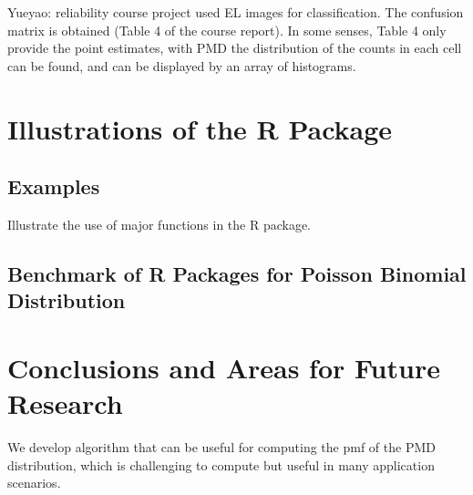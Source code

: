 \documentclass[12pt]{article}
\begin{document}
Yueyao: reliability course project used EL images for classification. The confusion matrix is obtained (Table 4 of the course report). In some senses, Table 4 only provide the point estimates, with PMD the distribution of the counts in each cell can be found, and can be displayed by an array of histograms. 




\section{Illustrations of the R Package}
\subsection{Examples}
Illustrate the use of major functions in the R package.


\subsection{Benchmark of R Packages for Poisson Binomial Distribution}



\section{Conclusions and Areas for Future Research}

We develop algorithm that can be useful for computing the pmf of the PMD distribution, which is challenging to compute but useful in many application scenarios.





	


%



	
\end{document}
